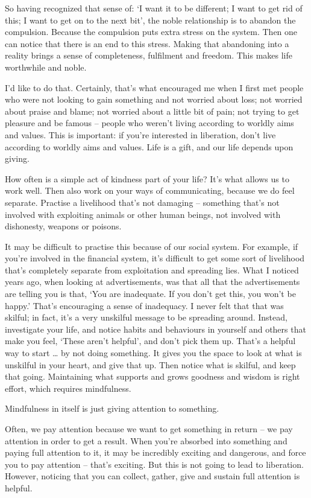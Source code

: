 So having recognized that sense of: `I want it to be different; I want to get
rid of this; I want to get on to the next bit', the noble relationship is to
abandon the compulsion. Because the compulsion puts extra stress on the system.
Then one can notice that there is an end to this stress. Making that abandoning
into a reality brings a sense of completeness, fulfilment and freedom. This
makes life worthwhile and noble.

I'd like to do that. Certainly, that's what encouraged me when I first met
people who were not looking to gain something and not worried about loss; not
worried about praise and blame; not worried about a little bit of pain; not
trying to get pleasure and be famous -- people who weren't living according to
worldly aims and values. This is important: if you're interested in liberation,
don't live according to worldly aims and values. Life is a gift, and our life
depends upon giving.

How often is a simple act of kindness part of your life? It's what allows us to
work well. Then also work on your ways of communicating, because we do feel
separate. Practise a livelihood that's not damaging -- something that's not
involved with exploiting animals or other human beings, not involved with
dishonesty, weapons or poisons.

It may be difficult to practise this because of our social system. For example,
if you're involved in the financial system, it's difficult to get some sort of
livelihood that's completely separate from exploitation and spreading lies. What
I noticed years ago, when looking at advertisements, was that all that the
advertisements are telling you is that, `You are inadequate. If you don't get
this, you won't be happy.' That's encouraging a sense of inadequacy. I never
felt that that was skilful; in fact, it's a very unskilful message to be
spreading around. Instead, investigate your life, and notice habits and
behaviours in yourself and others that make you feel, `These aren't helpful',
and don't pick them up. That's a helpful way to start \ldots{} by not doing
something. It gives you the space to look at what is unskilful in your heart,
and give that up. Then notice what is skilful, and keep that going. Maintaining
what supports and grows goodness and wisdom is right effort, which requires mindfulness.

Mindfulness in itself is just giving attention to something.

Often, we pay attention because we want to get something in return -- we pay
attention in order to get a result. When you're absorbed into something and
paying full attention to it, it may be incredibly exciting and dangerous, and force
you to pay attention -- that's exciting. But this is not going to lead to
liberation. However, noticing that you can collect, gather, give and sustain full attention is helpful. 


